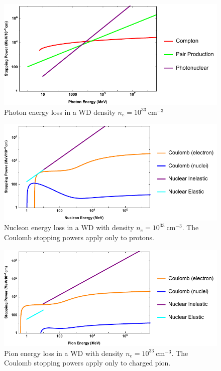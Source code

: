 \documentclass[twocolumn,showpacs,preprintnumbers,amsmath,amssymb,prd]{revtex4}
\begin{document}
\begin{appendices}
\begin{figure}
\includegraphics[scale=.60]{SPphoton.pdf}
\caption{Photon energy loss in a WD density $n_e = 10^{33} ~\text{cm}^{-3}$}
\label{fig:SPphoton}
\end{figure}

\begin{figure}
\includegraphics[scale=.60]{SPnucleon.pdf}
\caption{Nucleon energy loss in a WD with density $n_e = 10^{33} ~\text{cm}^{-3}$. The Coulomb stopping powers apply only to protons.}
\label{fig:SPnuc}
\end{figure}

\begin{figure}
\includegraphics[scale=.60]{SPpion.pdf}
\caption{Pion energy loss in a WD with density $n_e = 10^{33} ~\text{cm}^{-3}$. The Coulomb stopping powers apply only to charged pion.}
\label{fig:SPpion}
\end{figure}


\end{appendices}
\end{document}
